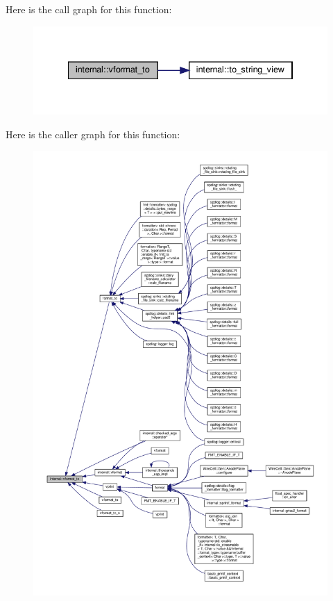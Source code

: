 Here is the call graph for this function\+:
\nopagebreak
\begin{figure}[H]
\begin{center}
\leavevmode
\includegraphics[width=334pt]{namespaceinternal_a9f6f592ec8a979251038265f241e7d48_cgraph}
\end{center}
\end{figure}
Here is the caller graph for this function\+:
\nopagebreak
\begin{figure}[H]
\begin{center}
\leavevmode
\includegraphics[width=350pt]{namespaceinternal_a9f6f592ec8a979251038265f241e7d48_icgraph}
\end{center}
\end{figure}
\mbox{\label{namespaceinternal_a1d6eb1d297ebb5fc0f724732f23b22eb}} 
